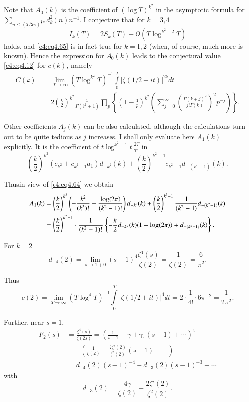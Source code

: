 Note that $A_0 (k)$ is the coefficient of $(\log T)^{k^2}$ in the
asymptotic formula for $\sum\limits_{n \leq (T/2 \pi)^{\frac{1}{2}k}} d_k^2 (n)
n^{-1}$. I conjecture that for $k= 3,4$
\begin{equation}
  I_k (T) = 2S_k (T)+ O\left(T \log^{k^2- 2}T\right)\label{c4:eq4.65}
\end{equation}
holds, and \eqref{c4:eq4.65} is in fact true for $k=1,2$ (when, of
course, much more is known). Hence the expression for $A_0(k)$ leads
to the conjectural value \eqref{c4:eq4.12} for $c(k)$, namely
\begin{align*}
  C(k) & = \lim\limits_{T \to \infty} \left(T \log^{k^2} T\right)^{-1}
  \int\limits_0^T |\zeta (1/2 + it)|^{2k} dt\\
  & = 2 \left( \frac{k}{2}\right)^{k^2} \frac{1}{\Gamma (k^2 +1)}
  \prod_p \left\{\left(1- \frac{1}{p} \right)^{k^2} \left(
  \sum_{j=0}^\infty \left(\frac{\Gamma
    (k+j)^2}{j! \Gamma (k)}\right)^2 p^{-j} \right)\right\}.
\end{align*}

Other coefficients $A_j (k)$ can be also calculated, although the
calculations turn out to be quite tedious as $j$ increases. I shall
only evaluate here $A_1 (k)$ explicitly. It is the coefficient of $t
\log^{k^2-1}t \bigg|_T^{2T}$ in 
$$
\left(\frac{k}{2}\right)^{k^2} \left(c_{k^2} + c_{k^2-1} a_1
\right)d_{-k^2} (k) + \left(\frac{k}{2} \right)^{k^2-1} c_{k^2 -1}d_{-
(k^2-1)} (k).
$$

Thus\pageoriginale in view of \eqref{c4:eq4.64} we obtain
\begin{align}
  A_1 (k) & = \left(\frac{k}{2} \right)^{k^2} \left(-
  \frac{k^2}{(k^2)!} - \frac{\log (2 \pi)}{(k^2 -1)!} \right) d_{-k^2}
  (k) + \left(\frac{k}{2} \right)^{k^2-1} \frac{1}{(k^2 -1)} d_{- (k^2
    -1)}(k)\label{c4:eq4.66}\\
  & = \left(\frac{k}{2} \right)^{k^2-1} \cdot \frac{1}{(k^2-1)!}
  \left\{- \frac{k}{2} d_{-k^2}(k) (1+ \log (2\pi)) + d_{- (k^2 -1)}(k)
  \right\}.\notag 
\end{align}

For $k=2$
$$ 
d_{-4}(2) = \lim\limits_{s \to 1+0} (s-1)^4 \frac{\zeta^4
   (s)}{\zeta(2)} = \frac{1}{\zeta(2)} = \frac{6}{\pi^2}.
$$

Thus
$$
c(2) = \lim\limits_{T \to \infty} (T \log^4 T)^{-1} \int\limits_0^T |
\zeta (1/2 + it)|^4 dt = 2 \cdot \frac{1}{4!} \cdot 6 \pi^{-2} =
\frac{1}{2\pi^2}. 
$$

Further, near $s=1$,
\begin{align*}
  F_2 (s) & = \frac{\zeta^4 (s)}{\zeta(2 s)} = \left( \frac{1}{s-1} +
  \gamma + \gamma_1 (s-1) + \cdots \right)^4 \\
  & \qquad\left(\frac{1}{\zeta(2)}
  - \frac{2 \zeta'(2)}{\zeta^2 (2)} (s-1) + \ldots \right)\\
  & = d_{-4} (2) (s-1)^{-4} + d_{-3} (2) (s-1)^{-3} + \cdots
\end{align*}
with
$$
d_{-3} (2) = \frac{4 \gamma}{\zeta (2)} - \frac{2 \zeta'(2)}{\zeta^2 (2)}.
$$

